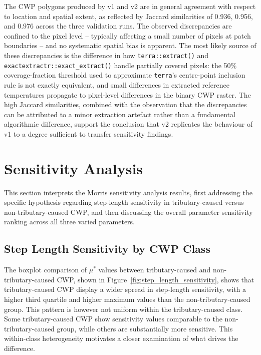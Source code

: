 The CWP polygons produced by v1 and v2 are in general agreement with 
respect to location and spatial extent, as reflected by Jaccard 
similarities of 0.936, 0.956, and 0.976 across the three validation 
runs. The observed discrepancies are confined to the pixel level -- 
typically affecting a small number of pixels at patch boundaries -- 
and no systematic spatial bias is apparent. The most likely source of these discrepancies is the difference in how 
\texttt{terra::extract()} and \texttt{exactextractr::exact\_extract()} 
handle partially covered pixels: the 50\% coverage-fraction threshold 
used to approximate \texttt{terra}'s centre-point inclusion rule is not 
exactly equivalent, and small differences in extracted reference 
temperatures propagate to pixel-level differences in the binary CWP 
raster. The high Jaccard similarities, combined with the observation that the 
discrepancies can be attributed to a minor extraction artefact rather 
than a fundamental algorithmic difference, support the conclusion that 
v2 replicates the behaviour of v1 to a degree sufficient to transfer 
sensitivity findings.


\section{Sensitivity Analysis}
\label{sec:rq2_discussion}

This section interprets the Morris sensitivity analysis results, first 
addressing the specific hypothesis regarding step-length sensitivity in 
tributary-caused versus non-tributary-caused CWP, and then discussing 
the overall parameter sensitivity ranking across all three varied parameters.

\subsection{Step Length Sensitivity by CWP Class}


The boxplot comparison of $\mu^*$ values between tributary-caused and 
non-tributary-caused CWP, shown in Figure~\ref{fig:step_length_sensitivity}, 
shows that tributary-caused CWP display a wider spread in step-length 
sensitivity, with a higher third quartile and higher maximum values than the 
non-tributary-caused group. This pattern is however not uniform within the 
tributary-caused class. Some tributary-caused CWP show sensitivity values 
comparable to the non-tributary-caused group, while others are substantially 
more sensitive. This within-class heterogeneity motivates a closer examination 
of what drives the difference.

